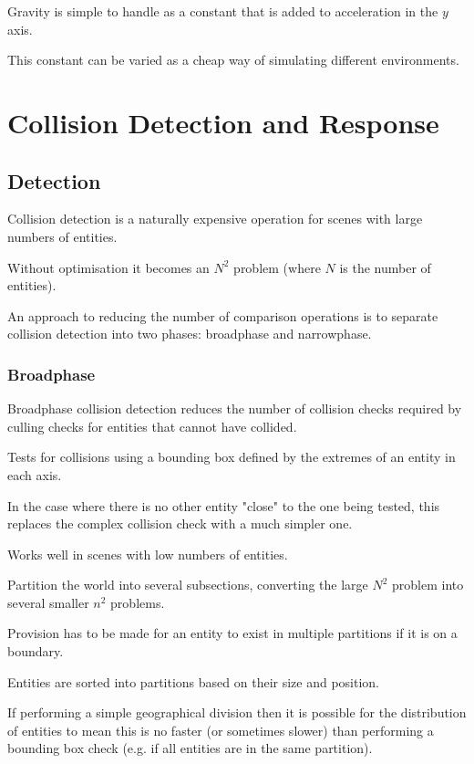 \documentclass[a4paper]{article}
\begin{document}
Gravity is simple to handle as a constant that is added to acceleration in the
$y$ axis.

This constant can be varied as a cheap way of simulating different environments.

\section{Collision Detection and Response}

\subsection{Detection}

Collision detection is a naturally expensive operation for scenes with large
numbers of entities.

Without optimisation it becomes an $N^{2}$ problem (where $N$ is the number of
entities).

An approach to reducing the number of comparison operations is to separate
collision detection into two phases: broadphase and narrowphase.

\subsubsection{Broadphase}

Broadphase collision detection reduces the number of collision checks required
by culling checks for entities that cannot have collided.


Tests for collisions using a bounding box defined by the extremes of an entity
in each axis.

In the case where there is no other entity "close" to the one being tested, this
replaces the complex collision check with a much simpler one.

Works well in scenes with low numbers of entities.


Partition the world into several subsections, converting the large $N^{2}$
problem into several smaller $n^{2}$ problems.

Provision has to be made for an entity to exist in multiple partitions if it is
on a boundary.

Entities are sorted into partitions based on their size and position.

If performing a simple geographical division then it is possible for the
distribution of entities to mean this is no faster (or sometimes slower) than
performing a bounding box check (e.g. if all entities are in the same
partition).
\end{document}
